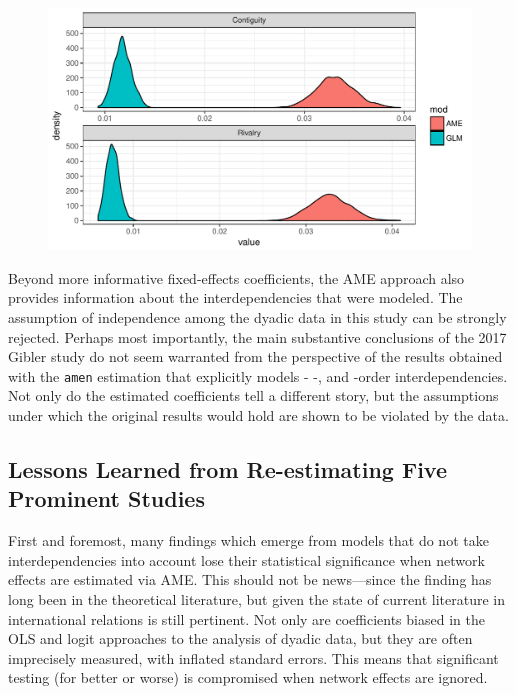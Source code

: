 \begin{figure}
	\caption{}
	\includegraphics[width=\textwidth]{gibler_margeff.pdf}
 	\label{fig:gibmargeff}
 \end{figure}

Beyond more informative fixed-effects coefficients, the AME approach also provides information about the interdependencies that were modeled. The assumption of independence among the dyadic data in this study can be strongly rejected. Perhaps most importantly, the main substantive conclusions of the 2017 Gibler study do not seem warranted from the perspective of the results obtained with the \texttt{amen} estimation that explicitly models \first- \second-, and \third-order interdependencies. Not only do the estimated coefficients tell a different story, but the assumptions under which the original results would hold are shown to be violated by the data.

\subsection{Lessons Learned from Re-estimating Five Prominent Studies}

First and foremost, many  findings which emerge from models that do not take interdependencies into account lose their statistical significance when network effects are estimated via AME. This should not be news---since the finding has long been in the theoretical literature, but given the state of current literature in international relations is still pertinent.  Not only
are coefficients biased in the OLS and logit approaches to the analysis of dyadic data, but they are often imprecisely measured, with inflated standard errors.  This means that significant testing (for better or worse) is compromised when network effects are ignored.

